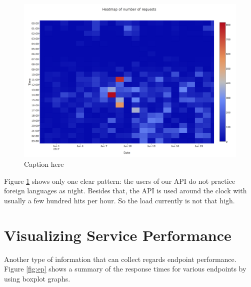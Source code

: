 \documentclass[conference]{IEEEtran}
\begin{document}
    \begin{figure}[h!]
      \centering
      \includegraphics[width=\linewidth]{daily_patterns}
      \caption{Caption here}
      \label{fig:dp}
    \end{figure}


  Figure \ref{fig:dp} shows only one clear pattern: the users of our API do not practice foreign languages as night. Besides that, the API is used around the clock with usually a few hundred hits per hour. So the load currently is not that high. 



\section{Visualizing Service Performance}

  Another type of information that \tool can collect regards endpoint performance. Figure \ref{fig:ep} shows a summary of the response times for various endpoints by using boxplot graphs. 

\end{document}
